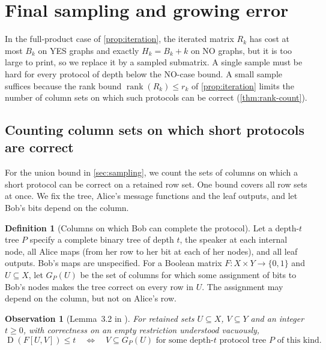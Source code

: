 \documentclass[11pt,letterpaper]{article} \usepackage[utf8]{inputenc}
\theoremstyle{plain} \newtheorem{theorem}{Theorem}[section]
\newtheorem{observation}[observation]{Observation}
\theoremstyle{definition} \newaliascnt{definition}{theorem}
\newtheorem{definition}[definition]{Definition} \aliascntresetthe{definition}
\newcommand{\D}{\operatorname{D}}
\DeclareMathOperator{\rank}{rank} \crefname{claim}{Claim}{Claims}
\begin{document}

\section{Final sampling and growing error}
\label{sec:quantitative}

In the full-product case of \cref{prop:iteration}, the iterated matrix $R_k$
has cost at most $B_k$ on YES graphs and exactly $H_k=B_k+k$ on NO graphs, but it is too large to print, so we replace it by a sampled
submatrix. A single sample must be hard for every protocol of depth below the NO-case
bound. A small sample suffices because the rank bound $\rank(R_k)\le r_k$
of \cref{prop:iteration} limits the number of column sets on which such
protocols can be correct (\cref{thm:rank-count}).

\subsection{Counting column sets on which short protocols are correct}

For the union bound in \cref{sec:sampling}, we count the sets of columns on
which a short protocol can be correct on a retained row set. One bound
covers all row sets at once. We fix the tree, Alice's message functions and the leaf
outputs, and let Bob's bits depend on the column.

\begin{definition}[Columns on which Bob can complete the protocol]\label{def:compatibility}
Let a depth-$t$ tree $P$ specify a complete binary tree of
depth $t$, the speaker at each internal node, all Alice maps (from her row to
her bit at each of her nodes), and all leaf outputs. Bob's maps are unspecified. For a Boolean matrix
$F:X\times Y\to\{0,1\}$ and $U\subseteq X$, let $G_P(U)$ be the set of columns
for which some assignment of bits to Bob's nodes makes the tree correct on every
row in $U$. The assignment may depend on the column, but not on Alice's row.
\end{definition}

\begin{observation}[Lemma~3.2 in \cite{mackenzie2026condensation}]\label{obs:compatible-protocol}
For retained sets $U\subseteq X$, $V\subseteq Y$ and an integer $t\ge0$, with correctness on an empty restriction understood
vacuously,
\begin{equation}\label{eq:compatibility}
 \D(F[U,V])\le t
 \quad\Longleftrightarrow\quad
 V\subseteq G_P(U)\text{ for some depth-}t\text{ protocol tree }P\text{ of this kind}.
\end{equation}
\end{observation}
\end{document}
